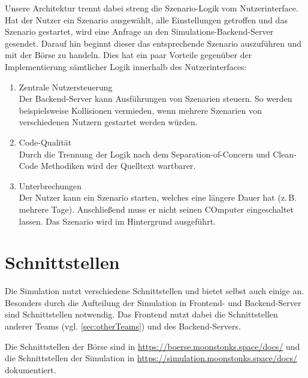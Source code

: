 Unsere Architektur trennt dabei streng die Szenario-Logik vom Nutzerinterface.
Hat der Nutzer ein Szenario ausgewählt, alle Einstellungen getroffen und das Szenario gestartet, wird eine Anfrage an den Simulations-Backend-Server gesendet. Darauf hin beginnt dieser das entsprechende Szenario auszuführen und mit der Börse zu handeln.
Dies hat ein paar Vorteile gegenüber der Implementierung sämtlicher Logik innerhalb des Nutzerinterfaces:
\begin{enumerate}
    \item Zentrale Nutzersteuerung\\
        Der Backend-Server kann Ausführungen von Szenarien steuern. So werden beispielsweise Kollisionen vermieden, wenn mehrere Szenarien von verschiedenen Nutzern gestartet werden würden.
    \item Code-Qualität\\
        Durch die Trennung der Logik nach dem Separation-of-Concern und Clean-Code Methodiken wird der Quelltext wartbarer.
    \item Unterbrechungen\\
        Der Nutzer kann ein Szenario starten, welches eine längere Dauer hat (z.\,B. mehrere Tage). Anschließend muss er nicht seinen COmputer eingeschaltet lassen. Das Szenario wird im Hintergrund ausgeführt.
\end{enumerate}











\section{Schnittstellen}
Die Simulation nutzt verschiedene Schnittstellen und bietet selbst auch einige an. Besonders durch die Aufteilung der Simulation in Frontend- und Backend-Server sind Schnittstellen notwendig.
Das Frontend nutzt dabei die Schnittstellen anderer Teams (vgl. \autoref{sec:otherTeams}) und des Backend-Servers.

Die Schnittstellen der Börse sind in \href{https://boerse.moonstonks.space/docs/}{https://boerse.moonstonks.space/docs/} und die Schnittstellen der Simulation in \href{https://simulation.moonstonks.space/docs/}{https://simulation.moonstonks.space/docs/} dokumentiert.

